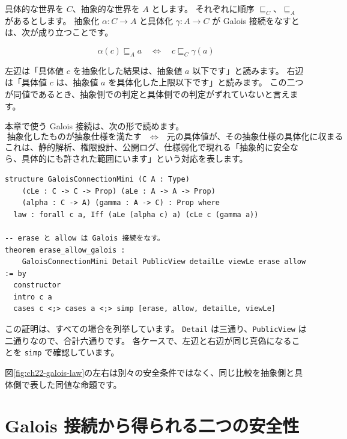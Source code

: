 具体的な世界を \(C\)、抽象的な世界を \(A\) とします。
それぞれに順序 \(\sqsubseteq_C\)、\(\sqsubseteq_A\) があるとします。
抽象化 \(\alpha : C \to A\) と具体化 \(\gamma : A \to C\) が Galois 接続をなすとは、次が成り立つことです。

\[
  \alpha(c) \sqsubseteq_A a
  \quad\Longleftrightarrow\quad
  c \sqsubseteq_C \gamma(a)
\]

左辺は「具体値 \(c\) を抽象化した結果は、抽象値 \(a\) 以下です」と読みます。
右辺は「具体値 \(c\) は、抽象値 \(a\) を具体化した上限以下です」と読みます。
この二つが同値であるとき、抽象側での判定と具体側での判定がずれていないと言えます。

本章で使う Galois 接続は、次の形で読めます。
\[
  \text{抽象化したものが抽象仕様を満たす}
  \quad\Longleftrightarrow\quad
  \text{元の具体値が、その抽象仕様の具体化に収まる}
\]
これは、静的解析、権限設計、公開ログ、仕様弱化で現れる「抽象的に安全なら、具体的にも許された範囲にいます」という対応を表します。

\begin{listing}[htbp]
\begin{verbatim}
structure GaloisConnectionMini (C A : Type)
    (cLe : C -> C -> Prop) (aLe : A -> A -> Prop)
    (alpha : C -> A) (gamma : A -> C) : Prop where
  law : forall c a, Iff (aLe (alpha c) a) (cLe c (gamma a))

-- erase と allow は Galois 接続をなす。
theorem erase_allow_galois :
    GaloisConnectionMini Detail PublicView detailLe viewLe erase allow := by
  constructor
  intro c a
  cases c <;> cases a <;> simp [erase, allow, detailLe, viewLe]
\end{verbatim}
\caption{\texttt{GaloisConnectionMini}}
\label{lst:ch22-galois-def}
\end{listing}

この証明は、すべての場合を列挙しています。
\texttt{Detail} は三通り、\texttt{PublicView} は二通りなので、合計六通りです。
各ケースで、左辺と右辺が同じ真偽になることを \texttt{simp} で確認しています。

図\ref{fig:ch22-galois-law}の左右は別々の安全条件ではなく、同じ比較を抽象側と具体側で表した同値な命題です。


\section{Galois 接続から得られる二つの安全性}

